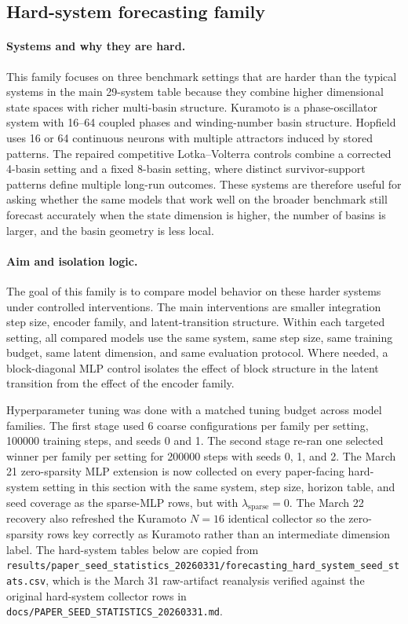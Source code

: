 \subsection{Hard-system forecasting family}

\paragraph{Systems and why they are hard.}
This family focuses on three benchmark settings that are harder than the
typical systems in the main 29-system table because they combine higher
dimensional state spaces with richer multi-basin structure. Kuramoto is a
phase-oscillator system with 16--64 coupled phases and winding-number basin
structure. Hopfield uses 16 or 64 continuous neurons with multiple attractors
induced by stored patterns. The repaired competitive Lotka--Volterra controls
combine a corrected 4-basin setting and a fixed 8-basin setting, where
distinct survivor-support patterns define multiple long-run outcomes. These
systems are therefore useful for asking whether the same models that work well
on the broader benchmark still forecast accurately when the state dimension is
higher, the number of basins is larger, and the basin geometry is less local.

\paragraph{Aim and isolation logic.}
The goal of this family is to compare model behavior on these harder systems
under controlled interventions. The main interventions are smaller integration
step size, encoder family, and latent-transition structure. Within each
targeted setting, all compared models use the same system, same step size, same
training budget, same latent dimension, and same evaluation protocol. Where
needed, a block-diagonal MLP control isolates the effect of block structure in
the latent transition from the effect of the encoder family.

Hyperparameter tuning was done with a matched tuning budget across model
families. The first stage used 6 coarse configurations per family per setting,
100000 training steps, and seeds 0 and 1. The second stage re-ran one selected
winner per family per setting for 200000 steps with seeds 0, 1, and 2.
The March 21 zero-sparsity MLP extension is now collected on every
paper-facing hard-system setting in this section with the same system, step
size, horizon table, and seed coverage as the sparse-MLP rows, but with
$\lambda_{\mathrm{sparse}} = 0$. The March 22 recovery also refreshed the
Kuramoto $N=16$ identical collector so the zero-sparsity rows key correctly as
Kuramoto rather than an intermediate dimension label. The hard-system tables
below are copied from
\texttt{results/paper\_seed\_statistics\_20260331/forecasting\_hard\_system\_seed\_stats.csv},
which is the March 31 raw-artifact reanalysis verified against the original
hard-system collector rows in
\texttt{docs/PAPER\_SEED\_STATISTICS\_20260331.md}.

